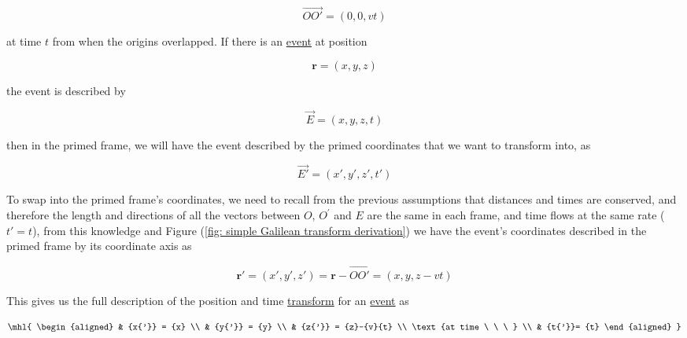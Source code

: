 \begin{equation}
	\vec{OO{'}} = (0,0,{v}{t})
\end{equation}

at time ${t}$ from when the origins overlapped.
If there is an \hyperlink{def-event}{event} at position

\begin{equation}
	\mathbf{r} = ({x},{y},{z})
\end{equation}

the event is described by

\begin{equation}
	\vec{E} = ({x},{y},{z},{t})
\end{equation}

then in the primed frame, we will have the event described by the primed coordinates that we want to transform into, as

\begin{equation}
	\vec{E{'}} = ({x{'}},{y{'}},{z{'}},t{'})
\end{equation}

To swap into the primed frame's coordinates, we need to recall from the previous assumptions that distances and times are conserved, and therefore the length and directions of all the vectors between ${O}$, ${O^{'}}$ and ${E}$ are the same in each frame, and time flows at the same rate (${t'} = {t}$), from this knowledge and Figure (\ref{fig: simple Galilean transform derivation}) we have the event's coordinates described in the primed frame by its coordinate axis as

\begin{equation}
	{\mathbf{r}{'}} = ({x{'}},{y{'}},{z{'}}) = \mathbf{r}-\vec{OO{'}} = ({x},{y},{z}-{v}{t})
	\label{eq: classical event}
\end{equation}

This gives us the full description of the position and time \hyperlink{def-transform}{transform} for an \hyperlink{def-event}{event} as

\begin{equation}
	\mhl{
		\begin{aligned}
			 & {x{'}} = {x}        \\
			 & {y{'}} = {y}        \\
			 & {z{'}} = {z}-{v}{t} \\
			\text{at time \ \ \ }  \\
			 & {t{'}}= {t}
		\end{aligned}
	}
	\label{eq: Galilean transformation}
\end{equation}

